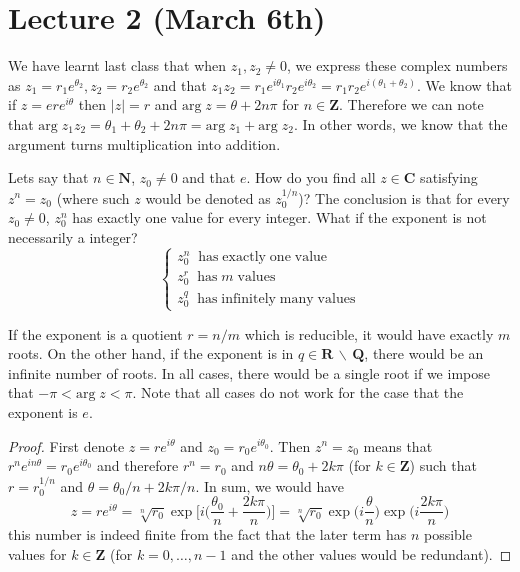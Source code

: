 \section{Lecture 2 (March 6th)}
We have learnt last class that when $z_1,z_2\ne 0$, we express these complex numbers as $z_1=r_1e^{\theta_2},z_2=r_2e^{\theta_2}$ and that $z_1z_2=r_1e^{i\theta_1}r_2e^{i\theta_2}=r_1r_2e^{i(\theta_1+\theta_2)}$. We know that if $z=ere^{i\theta }$ then $|z|=r$ and $\mathrm{arg}\;z=\theta +2n\pi $ for $n\in {\bm Z}$. Therefore we can note that $\mathrm{arg}\;z_1z_2=\theta_1+\theta_2+2n\pi =\mathrm{arg}\;z_1+\mathrm{arg}\;z_2$. In other words, we know that the argument turns multiplication into addition. 
\\
\begin{ex}
Lets say that $n\in {\bm N}$, $z_{0}\ne 0$ and that $e$. How do you find all $z\in {\bm C}$ satisfying $z^{n}=z_0$ (where such $z$ would be denoted as $z_0^{1/n}$)? The conclusion is that for every $z_0\ne 0$, $z^{n}_{0}$ has exactly one value for every integer. What if the exponent is not necessarily a integer? 
\[\begin{cases}
z_{0}^{n}\;\;\mathrm{has\; exactly\; one\; value}\\
z^{r}_{0}\;\;\mathrm{has}\;m\;\mathrm{values}\\
z_{0}^{q}\;\;\mathrm{has\; infinitely\; many\; values}
\end{cases}\]

If the exponent is a quotient $r=n/m$ which is reducible, it would have exactly $m$ roots. On the other hand, if the exponent is in $q\in {\bm R}\,\backslash\,{\bm Q}$, there would be an infinite number of roots. In all cases, there would be a single root if we impose that $-\pi <\mathrm{arg}\;z<\pi $. Note that all cases do not work for the case that the exponent is $e$.
\end{ex}
\vspace{2ex}
\begin{proof}
First denote $z=re^{i\theta }$ and $z_0=r_0e^{i\theta_0}$. Then $z^{n}=z_0$ means that $r^{n}e^{in \theta }=r_0e^{i \theta_0}$ and therefore $r^{n}=r_0$ and $n\theta =\theta_0+2k\pi $ (for $k\in {\bm Z}$) such that $r=r_0^{1/n}$ and $\theta =\theta_0/n+2k\pi /n$. In sum, we would have
\[z=re^{i\theta }=\sqrt[n]{r_0}\exp\Big[i\Big(\dfrac{\theta_0}{n}+\dfrac{2k\pi }{n}\Big)\Big]=\sqrt[n]{r_0}\exp\Big(i\dfrac{\theta }{n}\Big)\exp\Big(i\dfrac{2k\pi }{n}\Big)\]
this number is indeed finite from the fact that the later term has $n$ possible values for $k\in {\bm Z}$ (for $k=0,\ldots ,n-1$ and the other values would be redundant).
\end{proof}
